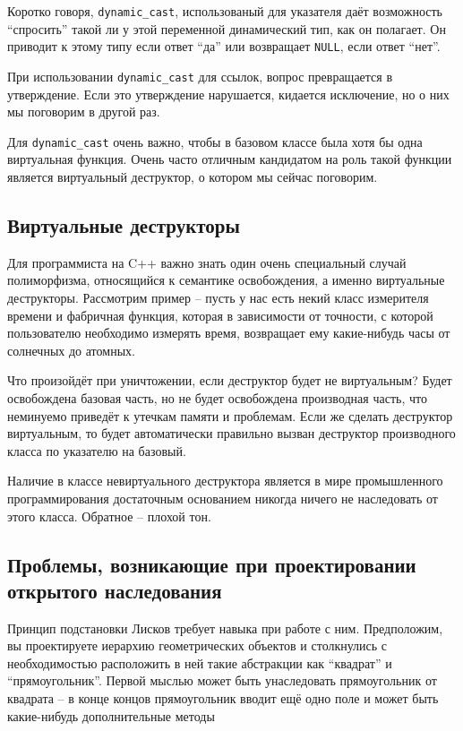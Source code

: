 \documentclass[a4paper,12pt,oneside]{article}
\begin{document}
Коротко говоря, \lstinline!dynamic_cast!, использованый для указателя даёт возможность ``спросить'' такой ли у этой переменной динамический тип, как он полагает. Он приводит к этому типу если ответ ``да'' или возвращает \lstinline!NULL!, если ответ ``нет''.

При использовании \lstinline!dynamic_cast! для ссылок, вопрос превращается в утверждение. Если это утверждение нарушается, кидается исключение, но о них мы поговорим в другой раз.

Для \lstinline!dynamic_cast! очень важно, чтобы в базовом классе была хотя бы одна виртуальная функция. Очень часто отличным кандидатом на роль такой функции является виртуальный деструктор, о котором мы сейчас поговорим.

\subsection{Виртуальные деструкторы}\label{virtdestr}

Для программиста на C++ важно знать один очень специальный случай полиморфизма, относящийся к семантике освобождения, а именно виртуальные деструкторы. Рассмотрим пример – пусть у нас есть некий класс измерителя времени и фабричная функция, которая в зависимости от точности, с которой пользователю необходимо измерять время, возвращает ему какие-нибудь часы от солнечных до атомных.



Что произойдёт при уничтожении, если деструктор будет не виртуальным? Будет освобождена базовая часть, но не будет освобождена производная часть, что неминуемо приведёт к утечкам памяти и проблемам. Если же сделать деструктор виртуальным, то будет автоматически правильно вызван деструктор производного класса по указателю на базовый.

Наличие в классе невиртуального деструктора является в мире промышленного программирования достаточным основанием никогда ничего не наследовать от этого класса. Обратное – плохой тон. 

\subsection{Проблемы, возникающие при проектировании открытого наследования}

Принцип подстановки Лисков требует навыка при работе с ним. Предположим, вы проектируете иерархию геометрических объектов и столкнулись с необходимостью расположить в ней такие абстракции как ``квадрат'' и ``прямоугольник''. Первой мыслью может быть унаследовать прямоугольник от квадрата – в конце концов прямоугольник вводит ещё одно поле и может быть какие-нибудь дополнительные методы
\end{document}
